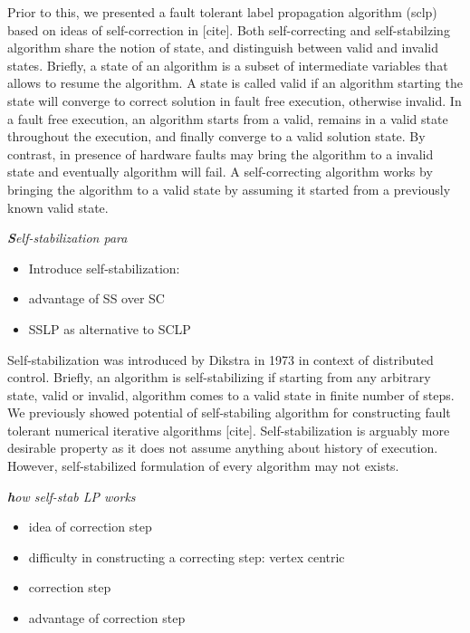 Prior to this, we presented a fault tolerant label propagation algorithm
(sclp) based on ideas of self-correction in {[}cite{]}. Both self-correcting
and self-stabilzing algorithm share the notion of state, and distinguish
between valid and invalid states. Briefly, a state of an algorithm
is a subset of intermediate variables that allows to resume the algorithm.
A state is called valid if an algorithm starting the state will converge
to correct solution in fault free execution, otherwise invalid. In
a fault free execution, an algorithm starts from a valid, remains
in a valid state throughout the execution, and finally converge to
a valid solution state. By contrast, in presence of hardware faults
may bring the algorithm to a invalid state and eventually algorithm
will fail. A self-correcting algorithm works by bringing the algorithm
to a valid state by assuming it started from a previously known valid
state.

\textbf{\emph{}}%
\begin{lyxgreyedout}
\textbf{\emph{S}}\emph{elf-stabilization para} 
\begin{itemize}
\item Introduce self-stabilization: 
\item advantage of SS over SC 
\item SSLP as alternative to SCLP 
\end{itemize}
\end{lyxgreyedout}

Self-stabilization was introduced by Dikstra in 1973 in context of
distributed control. Briefly, an algorithm is self-stabilizing if
starting from any arbitrary state, valid or invalid, algorithm comes
to a valid state in finite number of steps. We previously showed potential
of self-stabiling algorithm for constructing fault tolerant numerical
iterative algorithms {[}cite{]}. Self-stabilization is arguably more
desirable property as it does not assume anything about history of
execution. However, self-stabilized formulation of every algorithm
may not exists.

\textbf{\emph{}}%
\begin{lyxgreyedout}
\textbf{\emph{h}}\emph{ow self-stab LP works} 
\begin{itemize}
\item idea of correction step 
\item difficulty in constructing a correcting step: vertex centric 
\item correction step 
\item advantage of correction step 
\end{itemize}
\end{lyxgreyedout}

